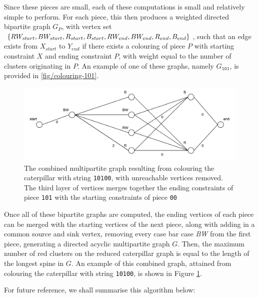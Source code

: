 \documentclass{mpaper}
\begin{document}
Since these pieces are small, each of these computations is small and relatively simple to perform. For each piece, this then produces a weighted directed bipartite graph $G_P$, with vertex set $\{RW_{start}, BW_{start}, R_{start}, B_{start}, \\ RW_{end}, BW_{end}, R_{end}, B_{end}\}$, such that an edge exists from $X_{start}$ to $Y_{end}$ if there exists a colouring of piece $P$ with starting constraint $X$ and ending constraint $P$, with weight equal to the number of clusters originating in $P$. An example of one of these graphs, namely $G_{\texttt{101}}$, is provided in \ref{fig/colouring-101}.

\begin{figure}
\begin{center}
    \centering
    \includegraphics[scale=0.75]{mpaper/figures/Colouring_10100.pdf}
    \caption{The combined multipartite graph resulting from colouring the caterpillar with string \texttt{10100}, with unreachable vertices removed. The third layer of vertices merges together the ending constraints of piece \texttt{101} with the starting constraints of piece \texttt{00}}
    \label{fig/colouring-10100}
\end{center}
\end{figure}

Once all of these bipartite graphs are computed, the ending vertices of each piece can be merged with the starting vertices of the next piece, along with adding in a common source and sink vertex, removing every case bar case \emph{BW} from the first piece, generating a directed acyclic multipartite graph $G$. Then, the maximum number of red clusters on the reduced caterpillar graph is equal to the length of the longest spine in $G$. An example of this combined graph, attained from colouring the caterpillar with string \texttt{10100}, is shown in Figure \ref{fig/colouring-10100}.



For future reference, we shall summarise this algorithm below:
\end{document}
